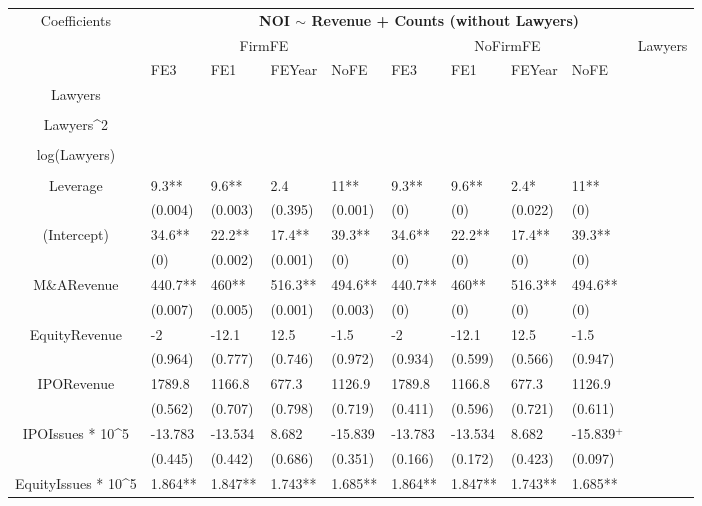 \documentclass{article}
\begin{document}
\begin{table}[H]
\centering
\begin{tabular}{|clllllllll|}
\hline
\multirow{3}{*}{Coefficients} & \multicolumn{9}{c|}{\textbf{NOI $\sim$ Revenue + Counts (without Lawyers)}} \\
\cline{2-10}
& \multicolumn{4}{c}{FirmFE} & \multicolumn{4}{c}{NoFirmFE} & \multirow{2}{*}{Lawyers} \\
\cline{2-9}
& FE3 & FE1 & FEYear & NoFE & FE3 & FE1 & FEYear & NoFE &  \\
\hline
 
Lawyers &  &  &  &  &  &  &  &  & \\ 
   &  &  &  &  &  &  &  &  & \\ 
  Lawyers^2 &  &  &  &  &  &  &  &  & \\ 
   &  &  &  &  &  &  &  &  & \\ 
  log(Lawyers) &  &  &  &  &  &  &  &  & \\ 
   &  &  &  &  &  &  &  &  & \\ 
  Leverage & 9.3** & 9.6** & 2.4 & 11** & 9.3** & 9.6** & 2.4* & 11** & \\ 
   & (0.004) & (0.003) & (0.395) & (0.001) & (0) & (0) & (0.022) & (0) & \\ 
  (Intercept) & 34.6** & 22.2** & 17.4** & 39.3** & 34.6** & 22.2** & 17.4** & 39.3** & \\ 
   & (0) & (0.002) & (0.001) & (0) & (0) & (0) & (0) & (0) & \\ 
  M\&ARevenue & 440.7** & 460** & 516.3** & 494.6** & 440.7** & 460** & 516.3** & 494.6** & \\ 
   & (0.007) & (0.005) & (0.001) & (0.003) & (0) & (0) & (0) & (0) & \\ 
  EquityRevenue & -2 & -12.1 & 12.5 & -1.5 & -2 & -12.1 & 12.5 & -1.5 & \\ 
   & (0.964) & (0.777) & (0.746) & (0.972) & (0.934) & (0.599) & (0.566) & (0.947) & \\ 
  IPORevenue & 1789.8 & 1166.8 & 677.3 & 1126.9 & 1789.8 & 1166.8 & 677.3 & 1126.9 & \\ 
   & (0.562) & (0.707) & (0.798) & (0.719) & (0.411) & (0.596) & (0.721) & (0.611) & \\ 
  IPOIssues * 10^5 & -13.783 & -13.534 & 8.682 & -15.839 & -13.783 & -13.534 & 8.682 & -15.839$^{+}$ & \\ 
   & (0.445) & (0.442) & (0.686) & (0.351) & (0.166) & (0.172) & (0.423) & (0.097) & \\ 
  EquityIssues * 10^5 & 1.864** & 1.847** & 1.743** & 1.685** & 1.864** & 1.847** & 1.743** & 1.685** & \\ 

\end{tabular}
\end{table}
\end{document}
